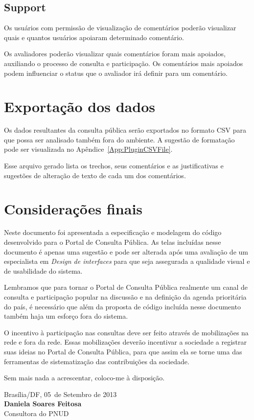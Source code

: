\documentclass[11pt]{article}
\newcommand{\MyName}{Daniela Soares Feitosa}
\newcommand{\MesEntrega}{Setembro de 2013}
\newcommand{\DiaEntrega}{05}
\begin{document}
\subsection{Support}

Os usuários com permissão de visualização de comentários poderão
visualizar quais e quantos usuários apoiaram determinado comentário.

Os avaliadores poderão visualizar quais comentários foram mais apoiados,
auxiliando o processo de consulta e participação. Os comentários mais
apoiados podem influenciar o status que o avaliador irá definir para um
comentário.

\section{Exportação dos dados}

Os dados resultantes da consulta pública serão exportados no formato CSV
para que possa ser analisado também fora do ambiente. A sugestão de
formatação pode ser visualizada no Apêndice~\ref{App:PluginCSVFile}.

Esse arquivo gerado lista os trechos, seus comentários e as
justificativas e sugestões de alteração de texto de cada um dos
comentários.

\newpage

\section{Considerações finais}

Neste documento foi apresentada a especificação e modelagem do código
desenvolvido para o Portal de Consulta Pública. As telas incluídas nesse
documento é apenas uma sugestão e pode ser alterada após uma avaliação
de um especialista em {\it Design de interfaces} para que seja
assegurada a qualidade visual e de usabilidade do sistema.

Lembramos que para tornar o Portal de Consulta Pública realmente um canal de
consulta e participação popular na discussão e na definição da agenda
prioritária do país, é necessário que além da proposta de código
incluída nesse documento também haja um esforço fora do sistema.

O incentivo à participação nas consultas deve ser feito através de
mobilizações na rede e fora da rede. Essas mobilizações deverão
incentivar a sociedade a registrar suas ideias no Portal de Consulta
Pública, para que assim ela se torne uma das ferramentas de
sistematização das contribuições da sociedade.

\vspace{1cm}

Sem mais nada a acrescentar, coloco-me à disposição.

\vspace{1cm}

\begin{minipage}{\textwidth}
  Brasília/DF, \DiaEntrega \ de \MesEntrega\\[1cm]
  \textbf{\MyName}\\
  \small Consultora do PNUD
\end{minipage}

\newpage
\appendix
\appendixpage

\end{document}
